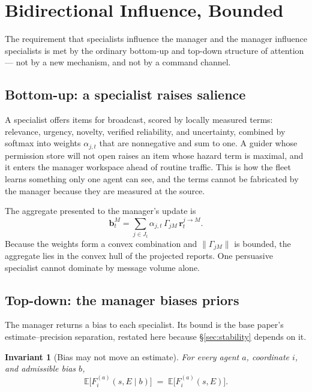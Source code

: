 \documentclass[11pt]{article}
\newtheorem{invariant}{Invariant}
\newcommand{\RJM}{\mathbf{r}^{j\rightarrow M}}
\begin{document}
\section{Bidirectional Influence, Bounded}
\label{sec:bidir}

The requirement that specialists influence the manager and the manager influence specialists is met by the ordinary bottom-up and top-down structure of attention --- not by a new mechanism, and not by a command channel.

\subsection{Bottom-up: a specialist raises salience}

A specialist offers items for broadcast, scored by locally measured terms: relevance, urgency, novelty, verified reliability, and uncertainty, combined by softmax into weights $\alpha_{j,t}$ that are nonnegative and sum to one. A guider whose permission store will not open raises an item whose hazard term is maximal, and it enters the manager workspace ahead of routine traffic. This is how the fleet learns something only one agent can see, and the terms cannot be fabricated by the manager because they are measured at the source.

The aggregate presented to the manager's update is
\begin{equation}
\mathbf{b}^{M}_t=\sum_{j\in J_t}\alpha_{j,t}\,\Gamma_{jM}\,\RJM_t .
\label{eq:bottomup}
\end{equation}
Because the weights form a convex combination and $\|\Gamma_{jM}\|$ is bounded, the aggregate lies in the convex hull of the projected reports. One persuasive specialist cannot dominate by message volume alone.

\subsection{Top-down: the manager biases priors}

The manager returns a bias to each specialist. Its bound is the base paper's estimate--precision separation, restated here because \S\ref{sec:stability} depends on it.

\begin{invariant}[Bias may not move an estimate]
\label{inv:bias}
For every agent $a$, coordinate $i$, and admissible bias $b$,
\begin{equation}
\mathbb{E}\big[F^{(a)}_i(s,E \mid b)\big] \;=\; \mathbb{E}\big[F^{(a)}_i(s,E)\big].
\label{eq:bias}
\end{equation}
\end{invariant}
\end{document}
